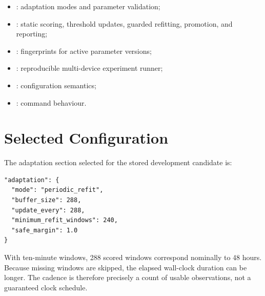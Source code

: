 \documentclass[11pt,a4paper]{article}
\begin{document}
\begin{itemize}
  \item {}: adaptation modes and parameter validation;
  \item {}: static scoring, threshold
  updates, guarded refitting, promotion, and reporting;
  \item {}: fingerprints for active parameter
  versions;
  \item {}: reproducible multi-device
  experiment runner;
  \item {}: configuration semantics;
  \item {}: command behaviour.
\end{itemize}

\section{Selected Configuration}

The adaptation section selected for the stored development candidate is:

\begin{verbatim}
"adaptation": {
  "mode": "periodic_refit",
  "buffer_size": 288,
  "update_every": 288,
  "minimum_refit_windows": 240,
  "safe_margin": 1.0
}
\end{verbatim}

With ten-minute windows, 288 scored windows correspond nominally to 48 hours.
Because missing windows are skipped, the elapsed wall-clock duration can be
longer. The cadence is therefore precisely a count of usable observations, not
a guaranteed clock schedule.
\end{document}
